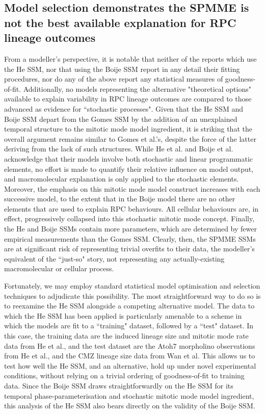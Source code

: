 \documentclass[10pt,letterpaper]{article}
\begin{document}
 \subsection*{Model selection demonstrates the SPMME is not the best available explanation for RPC lineage outcomes}
 
From a modeller's perspective, it is notable that neither of the reports which use the He SSM\cite{He2012,Wan2016}, nor that using the Boije SSM\cite{Boije2015} report in any detail their fitting procedures, nor do any of the above report any statistical measures of goodness-of-fit. Additionally, no models representing the alternative "theoretical options" available to explain variability in RPC lineage outcomes are compared to those advanced as evidence for ``stochastic processes". Given that the He SSM and Boije SSM  depart from the Gomes SSM by the addition of an unexplained temporal structure to the mitotic mode model ingredient, it is striking that the overall argument remains similar to Gomes et al.'s, despite the force of the latter deriving from the lack of such structures. While He et al. and Boije et al. acknowledge that their models involve both stochastic and linear programmatic elements, no effort is made to quantify their relative influence on model output, and macromolecular explanation is only applied to the stochastic elements. Moreover, the emphasis on this mitotic mode model construct increases with each successive model, to the extent that in the Boije model there are no other elements that are used to explain RPC behaviours. All cellular behaviours are, in effect, progressively collapsed into this stochastic mitotic mode concept. Finally, the He and Boije SSMs contain more parameters, which are determined by fewer empirical measurements than the Gomes SSM. Clearly, then, the SPMME SSMs are at significant risk of representing trivial overfits to their data, the modeller's equivalent of the ``just-so" story, not representing any actually-existing macromolecular or cellular process.

Fortunately, we may employ standard statistical model optimisation and selection techniques to adjudicate this possibility. The most straightforward way to do so is to reexamine the He SSM alongside a competing alternative model. The data to which the He SSM has been applied is particularly amenable to a scheme in which the models are fit to a ``training" dataset, followed by a ``test" dataset. In this case, the training data are the induced lineage size and mitotic mode rate data from He et al., and the test dataset are the Atoh7 morpholino observations from He et al., and the CMZ lineage size data from Wan et al. This allows us to test how well the He SSM, and an alternative, hold up under novel experimental conditions, without relying on a trivial ordering of goodness-of-fit to training data. Since the Boije SSM draws straightforwardly on the He SSM for its temporal phase-parameterisation and stochastic mitotic mode model ingredient, this analysis of the He SSM also bears directly on the validity of the Boije SSM.
\end{document}
